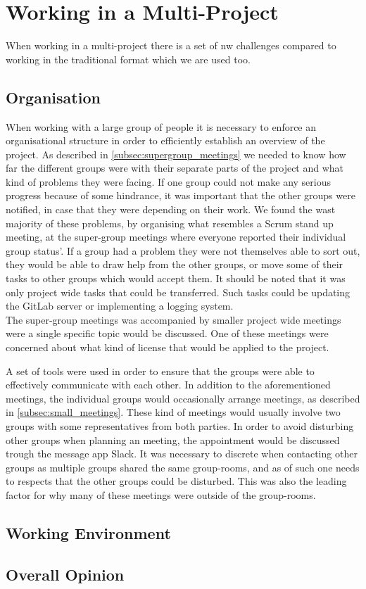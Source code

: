 \section{Working in a Multi-Project}
When working in a multi-project there is a set of nw challenges compared to working in the traditional format which we are used too.

\subsection{Organisation}
When working with a large group of people it is necessary to enforce an organisational structure in order to efficiently establish an overview of the project. As described in \cref{subsec:supergroup_meetings} we needed to know how far the different groups were with their separate parts of the project and what kind of problems they were facing. If one group could not make any serious progress because of some hindrance, it was important that the other groups were notified, in case that they were depending on their work. We found the wast majority of these problems, by organising what resembles a Scrum stand up meeting, at the super-group meetings where everyone reported their individual group status'. If a group had a problem they were not themselves able to sort out, they would be able to draw help from the other groups, or move some of their tasks to other groups which would accept them. It should be noted that it was only project wide tasks that could be transferred. Such tasks could be updating the GitLab server or implementing a logging system. \\
The super-group meetings was accompanied by smaller project wide meetings were a single specific topic would be discussed. One of these meetings were concerned about what kind of license that would be applied to the project.

A set of tools were used in order to ensure that the groups were able to effectively communicate with each other. In addition to the aforementioned meetings, the individual groups would occasionally arrange meetings, as described in \cref{subsec:small_meetings}. These kind of meetings would usually involve two groups with some representatives from both parties. In order to avoid disturbing other groups when planning an meeting, the appointment would be discussed trough the message app Slack. It was necessary to discrete when contacting other groups as multiple groups shared the same group-rooms, and as of such one needs to respects that the other groups could be disturbed. This was also the leading factor for why many of these meetings were outside of the group-rooms.

\subsection{Working Environment}


\subsection{Overall Opinion}
